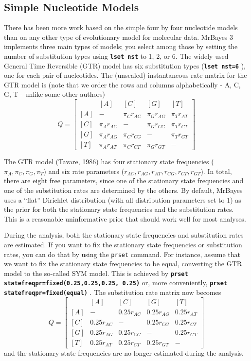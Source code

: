 \documentclass[12pt]{book}
\newcommand{\ttt}[1]{\texttt{#1} }
\newcommand{\tb}[1]{\texttt{\textbf{#1}} }
\begin{document}
\subsection{Simple Nucleotide Models}
There has been more work based on the simple four by four nucleotide models than on
any other type of evolutionary model for molecular data. MrBayes 3 implements three
main types of models; you select among those by setting the number of substitution types
using \tb{lset nst} to 1, 2, or 6. The widely used General Time Reversible (GTR) model
has six substitution types (\tb{lset nst=6}), one for each pair of nucleotides. The
(unscaled) instantaneous rate matrix for the GTR model is (note that we order the rows
and columns alphabetically - A, C, G, T - unlike some other authors)
\[
Q=\begin{bmatrix}
    & [A] & [C] & [G] & [T] \\ 
 [A]& - & \pi_C r_{AC} & \pi_G r_{AG} & \pi_T r_{AT}\\ 
 [C]& \pi_A r_{AC} & - & \pi_G r_{CG} &\pi_T r_{CT} \\ 
 [G]& \pi_A r_{AG} & \pi_C r_{CG}& - & \pi_T r_{GT}\\ 
 [T]& \pi_A r_{AT} & \pi_C r_{CT}&\pi_G r_{GT}  & -
\end{bmatrix}
\]

The GTR model (Tavare, 1986) has four stationary state frequencies ($\pi_A, \pi_C, \pi_G, \pi_T$) and
six rate parameters ($r_{AC}, r_{AG}, r_{AT}, r_{CG}, r_{CT}, r_{GT}$). In total, there are eight free 
parameters, since one of the stationary state frequencies and one of the substitution rates are
determined by the others. By default, MrBayes uses a ``flat'' Dirichlet distribution (with all distribution
parameters set to 1) as the prior for both the stationary state frequencies and the substitution rates.
This is a reasonable uninformative prior that should work well for most analyses.

During the analysis, both the stationary state frequencies and substitution rates are
estimated. If you want to fix the stationary state frequencies or substitution rates, you can
do that by using the \ttt{prset} command. For instance, assume that we want to fix the
stationary state frequencies to be equal, converting the GTR model to the so-called SYM
model. This is achieved by \tb{prset statefreqpr=fixed(0.25,0.25,0.25,
0.25)} or, more conveniently, \tb{prset statefreqpr=fixed(equal)}. The
substitution rate matrix now becomes
\[
Q=\begin{bmatrix}
    & [A] & [C] & [G] & [T] \\ 
 [A]& - & 0.25 r_{AC} & 0.25 r_{AG} & 0.25 r_{AT}\\ 
 [C]& 0.25 r_{AC} & - & 0.25 r_{CG} &0.25 r_{CT} \\ 
 [G]& 0.25 r_{AG} & 0.25 r_{CG}& - & 0.25 r_{GT}\\ 
 [T]& 0.25 r_{AT} & 0.25 r_{CT}&0.25 r_{GT}  & -
\end{bmatrix}
\]
and the stationary state frequencies are no longer estimated during the analysis.
\end{document}
